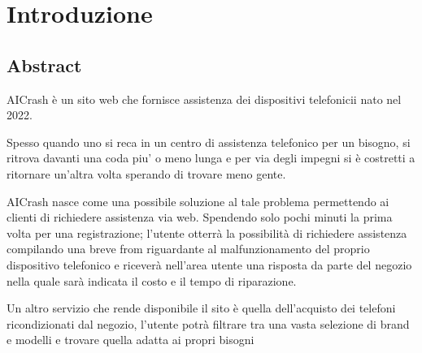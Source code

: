 \section{Introduzione}
 \subsection{Abstract}
AICrash è un sito web che fornisce assistenza dei dispositivi telefonicii nato nel 2022. 

Spesso quando uno si reca in un centro di assistenza telefonico per un bisogno, si ritrova
davanti una coda piu' o meno lunga e per via degli impegni si è costretti a ritornare un'altra volta 
sperando di trovare meno gente. 

AICrash nasce come una possibile soluzione al tale problema permettendo ai clienti di richiedere assistenza via web.
Spendendo solo pochi minuti la prima volta per una registrazione; l'utente otterrà la possibilità di richiedere assistenza
compilando una breve from riguardante al malfunzionamento del proprio dispositivo telefonico e
riceverà nell'area utente una risposta da parte del negozio nella quale sarà indicata il costo e il tempo di riparazione.

Un altro servizio che rende disponibile il sito è quella dell'acquisto dei telefoni ricondizionati
dal negozio, l'utente potrà filtrare tra una vasta selezione di brand e modelli e trovare
quella adatta ai propri bisogni
